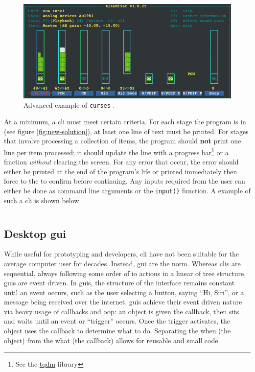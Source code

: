 \documentclass[11pt]{article}
\begin{document}
\begin{figure}[b!]
    \centering
    \includegraphics[width=\textwidth]{figures/ncurses_example.png}
    \caption{Advanced example of \texttt{curses} \cite{curses-api}.}
    \label{fig:ncurses-example}
\end{figure}

At a minimum, a \acrshort{cli} must meet certain criteria. For each stage the program is in (see figure \ref{fig:new-solution}), at least one line of text must be printed. For stages that involve processing a collection of items, the program should \textbf{not} print one line per item processed; it should update the line with a progress bar\footnote{See the \href{https://pypi.org/project/tqdm/}{tqdm} \gls{library}} or a fraction \textit{without} clearing the screen. For any error that occur, the error should either be printed at the end of the program's life or printed immediately then force to the to confirm before continuing. Any inputs required from the \gls{user} can either be done as command line arguments or the \texttt{input()} function. A example of such a \acrshort{cli} is shown below.

\inputminted[]{shell}{cli_examples/simple_cli.txt}

\subsection{Desktop \acrshort{gui}}

While useful for prototyping and developers, \acrshort{cli} have not been suitable for the average computer \gls{user} for decades. Instead, \acrfull{gui} are the norm. Whereas \acrshort{cli}s are sequential, always following some order of \acrshort{io} actions in a linear of tree structure, \acrshort{gui}s are event driven. In \acrshort{gui}s, the structure of the interface remains constant until an event occurs, such as the user selecting a button, saying ``Hi, Siri'', or a message being received over the internet. \acrshort{gui}s achieve their event driven nature via heavy usage of callbacks and \acrshort{oop}: an \gls{object} is given the callback, then sits and waits until an event or ``trigger'' occurs. Once the trigger activates, the \gls{object} uses the callback to determine what to do. Separating the when (the \gls{object}) from the what (the callback) allows for reusable and small code.
\end{document}
